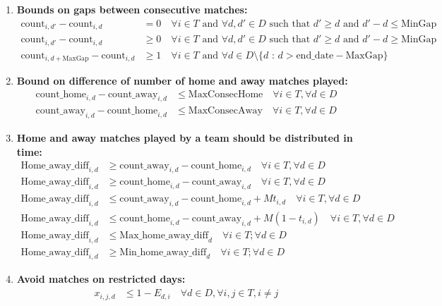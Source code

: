 \documentclass[a4paper, 12pt]{article}
\begin{document}
\begin{enumerate}
    \item \textbf{Bounds on gaps between consecutive matches:}
    \begin{align*}
        \text{count}_{i,d'} - \text{count}_{i,d} &= 0 \quad \forall i \in T \text{ and } \forall d, d' \in D \text{ such that $d' \geq d$ and $d' - d \leq \text{MinGap}$} \\
        \text{count}_{i,d'} - \text{count}_{i,d} &\geq 0 \quad \forall i \in T \text{ and } \forall d, d' \in D \text{ such that $d' \geq d$ and $d' - d \geq \text{MinGap}$} \\
        \text{count}_{i,d+\text{MaxGap}} - \text{count}_{i,d} &\geq 1 \quad \forall i \in T \text{ and } \forall d \in D \setminus \{d \text{ : } d > \text{end\_date} - \text{MaxGap} \} 
    \end{align*}

    \item \textbf{Bound on difference of number of home and away matches played:}
    \begin{align*}
        \text{count\_home}_{i,d} - \text{count\_away}_{i,d} &\leq \text{MaxConsecHome} \quad \forall i \in T , \forall d \in D \\
        \text{count\_away}_{i,d} - \text{count\_home}_{i,d} &\leq \text{MaxConsecAway} \quad \forall i \in T , \forall d \in D
    \end{align*}

    \item \textbf{Home and away matches played by a team should be distributed in time:}
    \begin{align*}
        \text{Home\_away\_diff}_{i,d} &\geq \text{count\_away}_{i,d} - \text{count\_home}_{i,d} \quad \forall i \in T, \forall d \in D\\
        \text{Home\_away\_diff}_{i,d} &\geq \text{count\_home}_{i,d} - \text{count\_away}_{i,d} \quad \forall i \in T, \forall d \in D \\
        \text{Home\_away\_diff}_{i,d} &\leq \text{count\_away}_{i,d} - \text{count\_home}_{i,d} + M t_{i,d} \quad \forall i \in T, \forall d \in D\\
        \text{Home\_away\_diff}_{i,d} &\leq \text{count\_home}_{i,d} - \text{count\_away}_{i,d} + M (1 - t_{i,d}) \quad \forall i \in T, \forall d \in D\\
        \text{Home\_away\_diff}_{i,d} &\leq \text{Max\_home\_away\_diff}_{d} \quad \forall i \in T; \forall d \in D\\
        \text{Home\_away\_diff}_{i,d} &\geq \text{Min\_home\_away\_diff}_{d} \quad \forall i \in T; \forall d \in D
    \end{align*}
    \item \textbf{Avoid matches on restricted days:}
    \begin{align*}
        x_{i,j,d} &\leq 1 - E_{d,i} \quad \forall d \in D, \forall i,j \in T, i \neq j
    \end{align*}


\end{enumerate}
\end{document}

